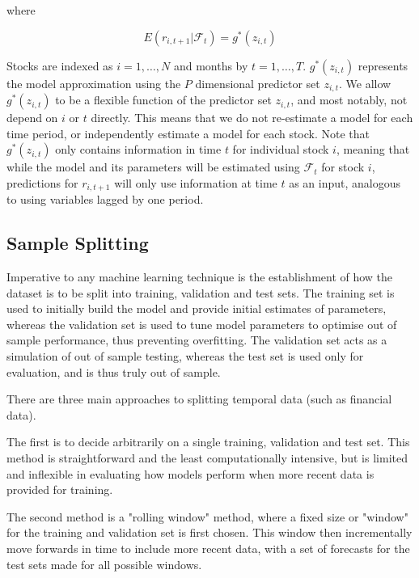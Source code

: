 \documentclass[a4paper, table]{article}
\begin{document}
where 

\begin{equation}
	E(r_{i, t+1} | \mathcal{F}_t) = g^*(z_{i,t})
\end{equation}

Stocks are indexed as $i = 1, \dots, N$ and months by $t = 1, \dots, T$. $g^*(z_{i,t})$ represents the model approximation using the $P$ dimensional predictor set $z_{i,t}$. We allow $g^*(z_{i,t})$ to be a flexible function of the predictor set $z_{i,t}$, and most notably, not depend on $i$ or $t$ directly. This means that we do not re-estimate a model for each time period, or independently estimate a model for each stock. Note that $g^*(z_{i,t})$ only contains information in time $t$ for individual stock $i$, meaning that while the model and its parameters will be estimated using $\mathcal{F}_t$ for stock $i$, predictions for $r_{i, t+1}$ will only use information at time $t$ as an input, analogous to using variables lagged by one period. 

\subsection{Sample Splitting}
\label{sample_split}

Imperative to any machine learning technique is the establishment of how the dataset is to be split into training, validation and test sets. The training set is used to initially build the model and provide initial estimates of parameters, whereas the validation set is used to tune model parameters to optimise out of sample performance, thus preventing overfitting. The validation set acts as a simulation of out of sample testing, whereas the test set is used only for evaluation, and is thus truly out of sample.

There are three main approaches to splitting temporal data (such as financial data). 

The first is to decide arbitrarily on a single training, validation and test set. This method is straightforward and the least computationally intensive, but is limited and inflexible in evaluating how models perform when more recent data is provided for training. 

The second method is a "rolling window" method, where a fixed size or "window" for the training and validation set is first chosen. This window then incrementally move forwards in time to include more recent data, with a set of forecasts for the test sets made for all possible windows.
\end{document}
